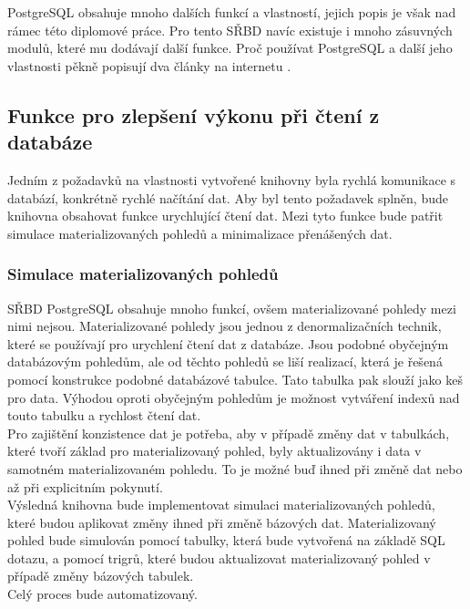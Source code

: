 \documentclass[ing,male,java,dept456]{diploma}						%
\begin{document}
PostgreSQL obsahuje mnoho dalších funkcí a vlastností, jejich popis je však nad rámec této diplomové práce. Pro tento SŘBD navíc existuje i mnoho zásuvných modulů, které mu dodávají další funkce. Proč používat PostgreSQL a další jeho vlastnosti pěkně popisují dva články na internetu \cite{postgre, postgre2}.

\subsection{Funkce pro zlepšení výkonu při čtení z databáze}
\label{subsec:ReadOpt}

Jedním z požadavků na vlastnosti vytvořené knihovny byla rychlá komunikace s databází, konkrétně rychlé načítání dat. Aby byl tento požadavek splněn, bude knihovna obsahovat funkce urychlující čtení dat. Mezi tyto funkce bude patřit simulace materializovaných pohledů a minimalizace přenášených dat.

\subsubsection{Simulace materializovaných pohledů}

SŘBD PostgreSQL obsahuje mnoho funkcí, ovšem materializované pohledy mezi nimi nejsou. Materializované pohledy jsou jednou z denormalizačních technik, které se používají pro urychlení čtení dat z databáze. Jsou podobné obyčejným databázovým pohledům, ale od těchto pohledů se liší realizací, která je řešená pomocí konstrukce podobné databázové tabulce. Tato tabulka pak slouží jako keš pro data. Výhodou oproti obyčejným pohledům je možnost vytváření indexů nad touto tabulku a rychlost čtení dat. \\
Pro zajištění konzistence dat je potřeba, aby v případě změny dat v tabulkách, které tvoří základ pro materializovaný pohled, byly aktualizovány i data v samotném materializovaném pohledu. To je možné buď ihned při změně dat nebo až při explicitním pokynutí. \\

Výsledná knihovna bude implementovat simulaci materializovaných pohledů, které budou aplikovat změny ihned při změně bázových dat. Materializovaný pohled bude simulován pomocí tabulky, která bude vytvořená na základě SQL dotazu, a pomocí trigrů, které budou aktualizovat materializovaný pohled v případě změny bázových tabulek. \\

Celý proces bude automatizovaný. 
\end{document}
